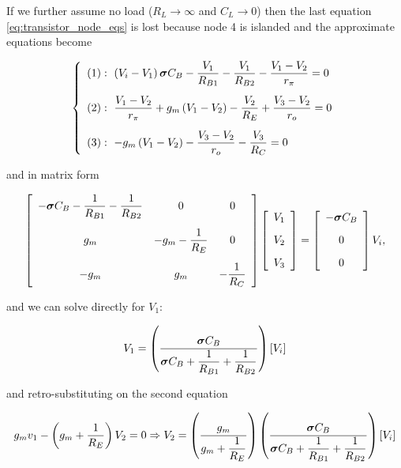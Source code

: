 	If we further assume no load ($R_L\to\infty$ and $C_L\to 0$) then the last equation \eqref{eq:transistor_node_eqs} is lost because node 4 is islanded and the approximate equations become

\begin{equation}
\left\{\begin{array}{l}
	(1):\ \left(V_i - V_1\right) \boldsymbol{\sigma} C_B - \dfrac{V_1}{R_{B1}} - \dfrac{V_1}{R_{B2}} - \dfrac{V_1 - V_2}{r_\pi} = 0 \\[5mm]
	(2):\ \dfrac{V_1 - V_2}{r_\pi} + g_m \left(V_1 - V_2\right) - \dfrac{V_2}{R_E} + \dfrac{V_3 - V_2}{r_o} = 0 \\[5mm]
	(3):\ -g_m \left(V_1 - V_2\right) - \dfrac{V_3 - V_2}{r_o} - \dfrac{V_3}{R_C} = 0
\end{array}\right. \label{eq:transistor_node_eqs_noload}
\end{equation}

	\noindent and in matrix form

\begin{equation}
\left[\begin{array}{ccc}
	 - \boldsymbol{\sigma} C_B - \dfrac{1}{R_{B1}} - \dfrac{1}{R_{B2}} & 0 & 0  \\[5mm]
	g_m & - g_m - \dfrac{1}{R_E} & 0 \\[5mm]
	-g_m & g_m & - \dfrac{1}{R_C}
\end{array}\right]
\left[\begin{array}{c} V_1 \\[3mm] V_2 \\[3mm] V_3 \end{array}\right] = \left[\begin{array}{c} -\boldsymbol{\sigma} C_B \\[3mm] 0 \\[3mm] 0 \end{array}\right]V_i, \end{equation}

	\noindent and we can solve directly for $V_1$:

\begin{equation} V_1 = \left( \dfrac{\boldsymbol{\sigma} C_B}{\boldsymbol{\sigma} C_B + \dfrac{1}{R_{B1}} + \dfrac{1}{R_{B2}}}\right)\left[V_i\right] \end{equation}

	\noindent and retro-substituting on the second equation

\begin{equation} g_m v_1 - \left( g_m + \dfrac{1}{R_E}\right)V_2 = 0 \Rightarrow V_2 = \left(\dfrac{g_m}{g_m + \dfrac{1}{R_E}}\right) \left( \dfrac{\boldsymbol{\sigma} C_B}{\boldsymbol{\sigma} C_B + \dfrac{1}{R_{B1}} + \dfrac{1}{R_{B2}}}\right)\left[V_i\right] \end{equation}

